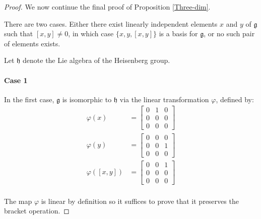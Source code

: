 \documentclass[honours]{UNSWthesis}
\newcommand{\g}{\mathfrak{g}}
\newcommand{\1}{\mathbf{e}_{1}}
\newcommand{\2}{\mathbf{e}_{3}}
\newcommand{\3}{\mathbf{e}_{3}}
\begin{document}
\begin{proof} We now continue the final proof of Proposition \ref{Three-dim}.

There are two cases. Either there exist linearly independent elements $x$ and $y$ of $\g$ such that $[x,y] \neq 0$, in which case $\{x,y,[x,y]\}$ is a basis for $\g$, or no such pair of elements exists. 

Let $\mathfrak{h}$ denote the Lie algebra of the Heisenberg group.

\paragraph*{Case 1} In the first case, $\g$ is isomorphic to $\mathfrak{h}$ via the linear transformation $\varphi$, defined by:
\begin{align*}
\varphi(x)&=\begin{bmatrix}
0 & 1 & 0 \\
0 & 0 & 0 \\
0 & 0 & 0 
\end{bmatrix}\\
\varphi(y)&=\begin{bmatrix}
0 & 0 & 0 \\
0 & 0 & 1 \\
0 & 0 & 0 
\end{bmatrix}\\
\varphi([x,y])&=\begin{bmatrix}
0 & 0 & 1 \\
0 & 0 & 0 \\
0 & 0 & 0 
\end{bmatrix}\\
\end{align*}


The map $\varphi$ is linear by definition so it suffices to prove that it preserves the bracket operation.


\end{proof}
\end{document}
